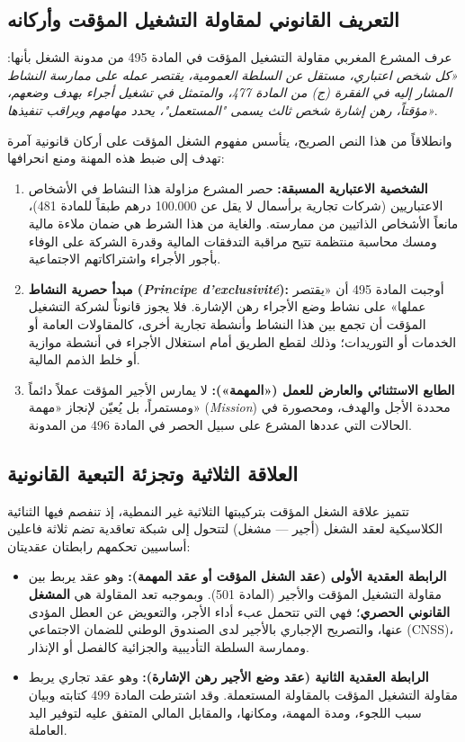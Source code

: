 \subsection{التعريف القانوني لمقاولة التشغيل المؤقت وأركانه}
عرف المشرع المغربي مقاولة التشغيل المؤقت في المادة \textenglish{495} من مدونة الشغل بأنها: \textit{«كل شخص اعتباري، مستقل عن السلطة العمومية، يقتصر عمله على ممارسة النشاط المشار إليه في الفقرة (ج) من المادة 477، والمتمثل في تشغيل أجراء بهدف وضعهم، مؤقتاً، رهن إشارة شخص ثالث يسمى "المستعمل"، يحدد مهامهم ويراقب تنفيذها»}.

وانطلاقاً من هذا النص الصريح، يتأسس مفهوم الشغل المؤقت على أركان قانونية آمرة تهدف إلى ضبط هذه المهنة ومنع انحرافها:
\begin{enumerate}[leftmargin=*, itemsep=5pt]
    \item \textbf{الشخصية الاعتبارية المسبقة:} حصر المشرع مزاولة هذا النشاط في الأشخاص الاعتباريين (شركات تجارية برأسمال لا يقل عن \textenglish{100.000} درهم طبقاً للمادة \textenglish{481})، مانعاً الأشخاص الذاتيين من ممارسته. والغاية من هذا الشرط هي ضمان ملاءة مالية ومسك محاسبة منتظمة تتيح مراقبة التدفقات المالية وقدرة الشركة على الوفاء بأجور الأجراء واشتراكاتهم الاجتماعية.
    \item \textbf{مبدأ حصرية النشاط (\textit{Principe d'exclusivité}):} أوجبت المادة \textenglish{495} أن «يقتصر عملها» على نشاط وضع الأجراء رهن الإشارة. فلا يجوز قانوناً لشركة التشغيل المؤقت أن تجمع بين هذا النشاط وأنشطة تجارية أخرى، كالمقاولات العامة أو الخدمات أو التوريدات؛ وذلك لقطع الطريق أمام استغلال الأجراء في أنشطة موازية أو خلط الذمم المالية.
    \item \textbf{الطابع الاستثنائي والعارض للعمل («المهمة»):} لا يمارس الأجير المؤقت عملاً دائماً ومستمراً، بل يُعيّن لإنجاز «مهمة» (\textit{Mission}) محددة الأجل والهدف، ومحصورة في الحالات التي عددها المشرع على سبيل الحصر في المادة \textenglish{496} من المدونة.
\end{enumerate}

\subsection{العلاقة الثلاثية وتجزئة التبعية القانونية}
تتميز علاقة الشغل المؤقت بتركيبتها الثلاثية غير النمطية، إذ تنفصم فيها الثنائية الكلاسيكية لعقد الشغل (أجير --- مشغل) لتتحول إلى شبكة تعاقدية تضم ثلاثة فاعلين أساسيين تحكمهم رابطتان عقديتان:

\begin{itemize}[leftmargin=*, itemsep=5pt]
    \item \textbf{الرابطة العقدية الأولى (عقد الشغل المؤقت أو عقد المهمة):} وهو عقد يربط بين مقاولة التشغيل المؤقت والأجير (المادة \textenglish{501}). وبموجبه تعد المقاولة هي \textbf{المشغل القانوني الحصري}؛ فهي التي تتحمل عبء أداء الأجر، والتعويض عن العطل المؤدى عنها، والتصريح الإجباري بالأجير لدى الصندوق الوطني للضمان الاجتماعي (\textenglish{CNSS})، وممارسة السلطة التأديبية والجزائية كالفصل أو الإنذار.
    \item \textbf{الرابطة العقدية الثانية (عقد وضع الأجير رهن الإشارة):} وهو عقد تجاري يربط مقاولة التشغيل المؤقت بالمقاولة المستعملة. وقد اشترطت المادة \textenglish{499} كتابته وبيان سبب اللجوء، ومدة المهمة، ومكانها، والمقابل المالي المتفق عليه لتوفير اليد العاملة.
\end{itemize}

